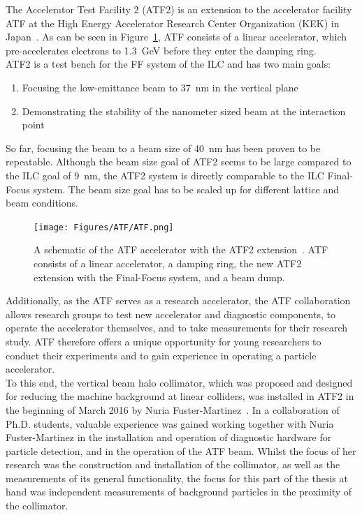 The Accelerator Test Facility 2 (ATF2) is an extension to the accelerator facility ATF at the High Energy Accelerator Research Center Organization (KEK) in Japan~\cite{ATF}. 
As can be seen in Figure~\ref{fig:ATF}, ATF consists of a linear accelerator, which pre-accelerates electrons to \SI{1.3}{\GeV} before they enter the damping ring. 
\\ATF2 is a test bench for the FF system of the ILC and has two main goals: 
\begin{enumerate}
 \item Focusing the low-emittance beam to \SI{37}{\nano\metre} in the vertical plane
 \item Demonstrating the stability of the nanometer sized beam at the interaction point
\end{enumerate}
So far, focusing the beam to a beam size of \SI{40}{\nano\metre} has been proven to be repeatable. 
Although the beam size goal of ATF2 seems to be large compared to the ILC goal of \SI{9}{\nano\metre}, the ATF2 system is directly comparable to the ILC Final-Focus system. 
The beam size goal has to be scaled up for different lattice and beam conditions.\\
\begin{figure}
\centering
\texttt{[image: Figures/ATF/ATF.png]}
\caption[ATF accelerator]{A schematic of the ATF accelerator with the ATF2 extension~\cite[cf. p. 65]{Nuria_Thesis}.
ATF consists of a linear accelerator, a damping ring, the new ATF2 extension with the Final-Focus system, and a beam dump.}
\label{fig:ATF}
\end{figure}
Additionally, as the ATF serves as a research accelerator, the ATF collaboration allows research groups to test new accelerator and diagnostic components, to operate the accelerator themselves, and to take measurements for their research study.
ATF therefore offers a unique opportunity for young researchers to conduct their experiments and to gain experience in operating a particle accelerator.
\\To this end, the vertical beam halo collimator, which was proposed and designed for reducing the machine background at linear colliders, was installed in ATF2 in the beginning of March 2016 by Nuria Fuster-Martinez~\cite{Nuria_Thesis}. 
In a collaboration of Ph.D. students, valuable experience was gained working together with Nuria Fuster-Martinez in the installation and operation of diagnostic hardware for particle detection, and in the operation of the ATF beam.
Whilst the focus of her research was the construction and installation of the collimator, as well as the measurements of its general functionality, the focus for this part of the thesis at hand was independent measurements of background particles in the proximity of the collimator.
